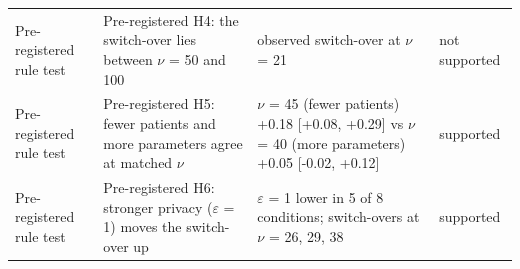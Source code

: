 \begin{table}[t]
\begin{tabular}{p{1.4cm}p{4.2cm}p{8.6cm}p{1.5cm}}
Pre-registered rule test & Pre-registered H4: the switch-over lies between $\nu$ = 50 and 100 & observed switch-over at $\nu$ = 21 & not supported \\
Pre-registered rule test & Pre-registered H5: fewer patients and more parameters agree at matched $\nu$ & $\nu$ = 45 (fewer patients) +0.18 {[}+0.08, +0.29{]} vs $\nu$ = 40 (more parameters) +0.05 {[}-0.02, +0.12{]} & supported \\
Pre-registered rule test & Pre-registered H6: stronger privacy ($\varepsilon$ = 1) moves the switch-over up & $\varepsilon$ = 1 lower in 5 of 8 conditions; switch-overs at $\nu$ = 26, 29, 38 & supported \\
\bottomrule
\end{tabular}
\label{tab:hyp_summary}
\end{table}

